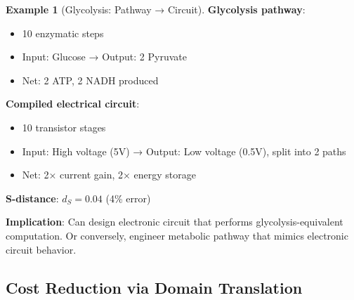 \documentclass[11pt,a4paper]{article}
\theoremstyle{definition}
\newtheorem{example}[theorem]{Example}
\theoremstyle{remark}
\begin{document}
\begin{example}[Glycolysis: Pathway → Circuit]
\textbf{Glycolysis pathway}:
\begin{itemize}
\item 10 enzymatic steps
\item Input: Glucose → Output: 2 Pyruvate
\item Net: 2 ATP, 2 NADH produced
\end{itemize}

\textbf{Compiled electrical circuit}:
\begin{itemize}
\item 10 transistor stages
\item Input: High voltage (5V) → Output: Low voltage (0.5V), split into 2 paths
\item Net: 2× current gain, 2× energy storage
\end{itemize}

\textbf{S-distance}: $d_S = 0.04$ (4\% error)

\textbf{Implication}: Can design electronic circuit that performs glycolysis-equivalent computation. Or conversely, engineer metabolic pathway that mimics electronic circuit behavior.
\end{example}

\subsection{Cost Reduction via Domain Translation}
\end{document}
